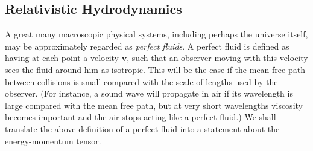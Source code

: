 
\subsection{Relativistic Hydrodynamics}\label{sec:2.10}

A great many macroscopic physical systems, including perhaps the universe
itself, may be approximately regarded as \emph{perfect fluids}. A perfect fluid
is defined as having at each point a velocity \(\mathbf v\), such that an
observer moving with this velocity sees the fluid around him as isotropic. This
will be the case if the mean free path between collisions is small compared with
the scale of lengths used by the observer. (For instance, a sound wave will
propagate in air if its wavelength is large compared with the mean free path,
but at very short wavelengths viscosity becomes important and the air stops
acting like a perfect fluid.) We shall translate the above definition of a
perfect fluid into a statement about the energy-momentum tensor.

